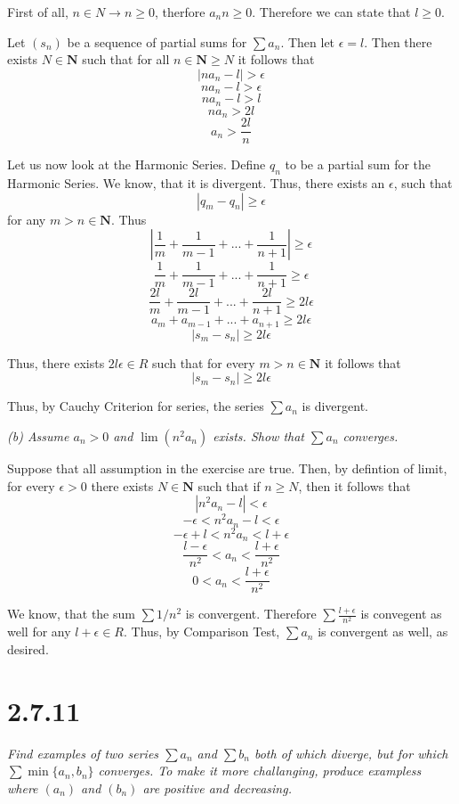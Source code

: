 \documentclass[11pt,oneside,titlepage]{article}
\begin{document}
First of all, $n \in N \to n \geq 0$, therfore $a_n n \geq 0$. Therefore
we can state that $l \geq 0$.

Let $(s_n)$ be a sequence of  partial sums  for $\sum a_n$. Then
let $\epsilon = l$. Then there exists $N \in \textbf{N}$ such that for all
$n \in \textbf{N} \geq N$ it follows that
$$ |n a_n - l| > \epsilon$$
$$ n a_n - l > \epsilon$$
$$ n a_n - l > l $$
$$ n a_n  > 2l $$
$$ a_n  > \frac{2l}{n} $$

Let us now look at the Harmonic Series. Define $q_n$ to be a partial sum for
the Harmonic Series. We know, that it is divergent. Thus,
there exists an $\epsilon$, such that
$$|q_m - q_n| \geq \epsilon$$
for any $m > n \in \textbf{N}$. Thus
$$|\frac{1}{m} + \frac{1}{m - 1} + ... + \frac{1}{n + 1} | \geq \epsilon$$
$$\frac{1}{m} + \frac{1}{m - 1} + ... + \frac{1}{n + 1} \geq \epsilon$$
$$\frac{2l}{m} + \frac{2l}{m - 1} + ... + \frac{2l}{n + 1} \geq 2l \epsilon$$
$$a_m + a_{m - 1} + ... + a_{n + 1} \geq 2l \epsilon$$
$$|s_m - s_n| \geq 2l \epsilon$$

Thus, there exists $2l\epsilon \in R$ such that for every
$m > n \in \textbf{N}$ it follows that 
$$|s_m - s_n| \geq 2l \epsilon$$

Thus, by Cauchy Criterion for series, the series $\sum a_n$ is divergent.

\textit{(b) Assume $a_n > 0$ and $\lim(n^2 a_n)$ exists. Show that
  $\sum a_n$ converges.}

Suppose that all assumption in the exercise are true. Then, by defintion
of limit, for every $\epsilon > 0$
there exists $N \in \textbf{N}$ such that if $n \geq N$, then it
follows that
$$|n^2 a_n - l| < \epsilon$$
$$- \epsilon < n^2 a_n - l < \epsilon$$
$$- \epsilon + l < n^2 a_n  < l + \epsilon$$
$$\frac{l - \epsilon}{n^2} < a_n  < \frac{l + \epsilon}{n^2}$$
$$0< a_n  < \frac{l + \epsilon}{n^2}$$

We know, that the sum $\sum 1/n^2$ is convergent. Therefore
$\sum \frac{ l + \epsilon}{n^2}$ is convegent as well for any
$l + \epsilon \in R$. Thus, by Comparison Test, $\sum a_n$ is convergent as
well, as desired.

\section*{2.7.11}
\textit{Find examples of two series $\sum a_n$ and $\sum b_n$ both of which
  diverge, but for which $\sum \min\{a_n, b_n\}$ converges. To make it more
  challanging, produce exampless where $(a_n)$ and $(b_n)$ are positive and
  decreasing.}
\end{document}
